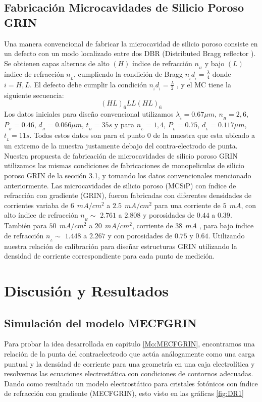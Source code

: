 \documentclass[a4paper,11pt,]{book}
\begin{document}
\subsection{Fabricación Microcavidades  de Silicio Poroso GRIN }
Una manera convencional de fabricar la microcavidad de silicio poroso consiste en un defecto con un modo localizado entre dos DBR (Distributed Bragg reflector ). Se obtienen capas alternas de alto $(H)$ índice de refracción $n_{_{H}}$ y bajo $(L)$ índice de refracción  $n_{_{L}}$, cumpliendo la condición de  Bragg $n_{_{i}}d_{_{i}}=\frac{\lambda}{4}$ donde $i= H,L$. El defecto debe cumplir la condición $n_{_{i}}d_{_{i}}=\frac{\lambda}{2}$ , y el MC tiene la siguiente secuencia: $$(HL)_6 LL (HL)_6$$
Los datos iniciales para diseño convencional utilizamos $\lambda_{_{c}}= 0.67 \mu m$, $n_{_{H}} =2,6$, $P_{_{H}} =0.46$, $d_{_{H}}=0.066 \mu m  $, $t_{_{H}}=35 s  $ y para  $n_{_{L}}= 1,4$,  $P_{_{L}} =0.75$, $d_{_{L}}=0.117 \mu m  $, $t_{_{L}}=11 s  $. Todos estos datos son para el punto $0$ de la muestra que esta ubicado a un extremo de la muestra justamente debajo del contra-electrodo de punta. 
Nuestra propuesta de  fabricación de microcavidades de silicio poroso GRIN utilizamos las mismas condiciones de fabricaciones de monopeliculas de silicio poroso GRIN de la sección 3.1, y tomando  los datos convencionales mencionado anteriormente. Las microcavidades de silicio poroso (MCSiP) con índice de refracción con gradiente (GRIN), fueron fabricadas con diferentes densidades de corrientes variaba de $6 \ \ mA/cm^2$ a $2.5 \ \ mA/cm^2$ para una corriente de $5 \ \  mA$, con alto índice de refracción $n_{_{H}} \sim$  $2.761$ a $2.808$  y  porosidades de $0.44$ a $0.39$. También para  $50\ \ mA/cm^2$ a $20\ \  mA/cm^2$, corriente de $38 \ \  mA$ , para bajo índice de refracción $n_{_{L}}\sim$  $1.448$ a $2.267$ y con porosidades de $  0.75 $ y $ 0.64 $. Utilizando nuestra relación de calibración para diseñar estructuras GRIN utilizando la densidad de corriente correspondiente para cada punto de medición. 
\section{Discusión y Resultados} 
\subsection{Simulación del modelo MECFGRIN}
Para probar la idea desarrollada en capitulo \ref{Mo:MECFGRIN}, encontramos una relación de la punta del contraelectrodo que actúa análogamente como una carga puntual y la densidad de corriente para una geometría en una caja electrolítica y resolvemos las ecuaciones electrostática con condiciones de contornos adecuadas. Dando como resultado un modelo electrostático para cristales fotónicos con índice de refracción con gradiente (MECFGRIN), esto visto en las gráficas \ref{fig:DR1}
\end{document}
